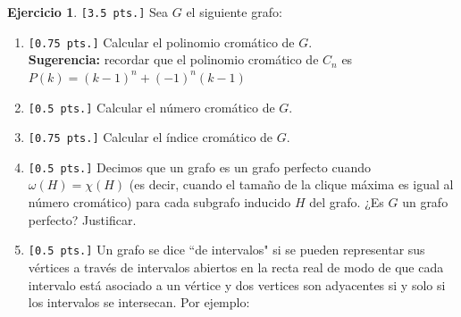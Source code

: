 \documentclass[a4paper,oneside,12pt]{amsart}
\theoremstyle{definition}
\newtheorem{quest}{Ejercicio}
\begin{document}



\begin{quest}\verb|[3.5 pts.]|
Sea $G$ el siguiente grafo:

    \begin{center}
    \end{center}

    \begin{enumerate}[label=\alph*)]
        \item \verb|[0.75 pts.]| Calcular el polinomio cromático de $G$. \\
        \textbf{Sugerencia:} recordar que el polinomio cromático de $C_n$ es $P(k)=(k-1)^n + (-1)^n(k-1)$
        \item \verb|[0.5 pts.]| Calcular el número cromático de $G$.
        \item \verb|[0.75 pts.]| Calcular el índice cromático de $G$.
        \item \verb|[0.5 pts.]| Decimos que un grafo es un grafo perfecto cuando $\omega(H)=\chi(H)$ (es decir,
        cuando el tamaño de la clique
        máxima es igual al número cromático) para cada subgrafo inducido $H$
        del grafo. ¿Es $G$ un grafo perfecto? Justificar.
        \item \verb|[0.5 pts.]|
        Un grafo se dice ``de intervalos" si se pueden representar sus vértices a través de intervalos abiertos
        en la recta real de modo de que cada intervalo está
        asociado a un vértice y dos vertices son adyacentes si y solo si los intervalos se intersecan. Por ejemplo:
        \begin{center}
             \hspace{2cm}
\end{center}
\end{enumerate}
\end{quest}
\end{document}
